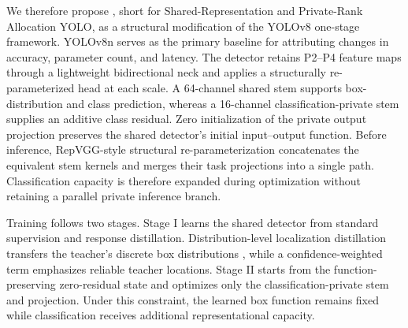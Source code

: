 We therefore propose \method{}, short for Shared-Representation and Private-Rank Allocation YOLO, as a structural modification of the YOLOv8 one-stage framework. YOLOv8n serves as the primary baseline for attributing changes in accuracy, parameter count, and latency. The detector retains P2--P4 feature maps through a lightweight bidirectional neck and applies a structurally re-parameterized head at each scale. A 64-channel shared stem supports box-distribution and class prediction, whereas a 16-channel classification-private stem supplies an additive class residual. Zero initialization of the private output projection preserves the shared detector's initial input--output function. Before inference, RepVGG-style structural re-parameterization \cite{ding2021repvgg} concatenates the equivalent stem kernels and merges their task projections into a single path. Classification capacity is therefore expanded during optimization without retaining a parallel private inference branch.

Training follows two stages. Stage I learns the shared detector from standard supervision and response distillation. Distribution-level localization distillation transfers the teacher's discrete box distributions \cite{zheng2022ld}, while a confidence-weighted term emphasizes reliable teacher locations. Stage II starts from the function-preserving zero-residual state and optimizes only the classification-private stem and projection. Under this constraint, the learned box function remains fixed while classification receives additional representational capacity.

